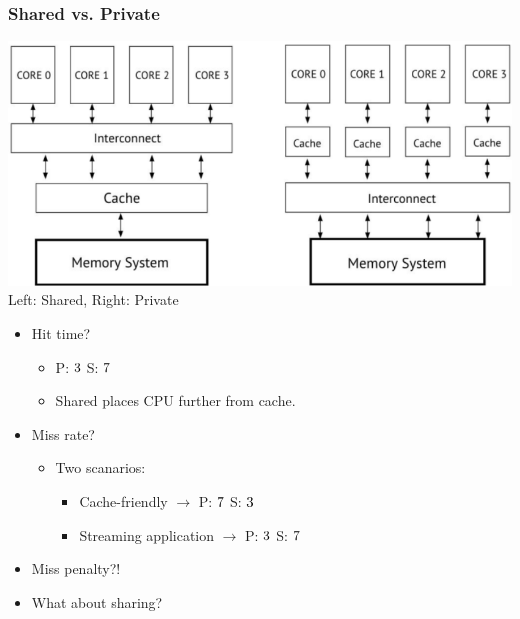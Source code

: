 \documentclass[10pt]{article}
\newcommand{\cmark}{\ding{51}}
\newcommand{\xmark}{\ding{55}}
\begin{document}
\subsubsection*{Shared vs. Private}
\begin{center}
    \includegraphics*[scale=0.5]{W8_5.png}
    Left: Shared, Right: Private
\end{center}
\begin{itemize}
    \item Hit time?
    \begin{itemize}
        \item P: $\cmark$ S: $\xmark$
        \item Shared places CPU further from cache.
    \end{itemize}
    \item Miss rate?
    \begin{itemize}
        \item Two scanarios:
        \begin{itemize}
            \item Cache-friendly $\rightarrow$ P: $\xmark$ S: $\cmark$
            \item Streaming application $\rightarrow$ P: $\cmark$ S: $\xmark$
        \end{itemize}
    \end{itemize}
    \item Miss penalty?!
    \item What about sharing?
\end{itemize}
\end{document}
